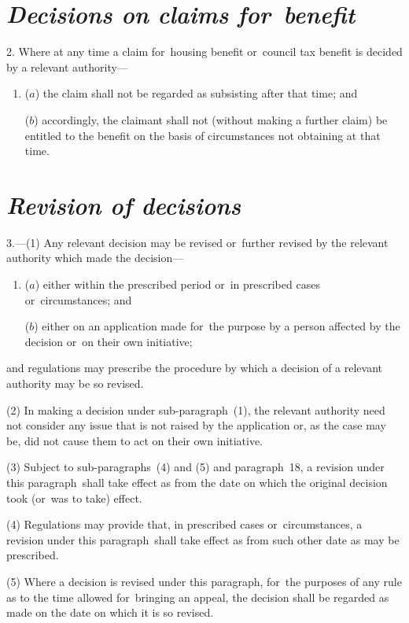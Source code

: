 \documentclass[12pt,a4paper]{article}
\begin{document}

\section*{\itshape Decisions on claims for~benefit}

2. Where at any time a claim for~housing benefit or~council tax benefit is decided by a relevant authority—
\begin{enumerate}\item[]
($a$) the claim shall not be regarded as subsisting after that time; and

($b$) accordingly, the claimant shall not (without making a further claim) be entitled to the benefit on the basis of circumstances not obtaining at that time.
\end{enumerate}

\section*{\itshape Revision of decisions}

3.---(1) Any relevant decision may be revised or~further revised by the relevant authority which made the decision—
\begin{enumerate}\item[]
($a$) either within the prescribed period or~in prescribed cases or~circumstances; and

($b$) either on an application made for~the purpose by a person affected by the decision or~on their own initiative;
\end{enumerate}
and regulations may prescribe the procedure by which a decision of a relevant authority may be so revised.

(2) In making a decision under sub-paragraph~(1), the relevant authority need not consider any issue that is not raised by the application or, as the case may be, did not cause them to act on their own initiative.

(3) Subject to sub-paragraphs~(4)  and (5)  and paragraph~18, a revision under this paragraph~shall take effect as from the date on which the original decision took (or~was to take) effect.

(4) Regulations may provide that, in prescribed cases or~circumstances, a revision under this paragraph~shall take effect as from such other date as may be prescribed.

(5) Where a decision is revised under this paragraph, for~the purposes of any rule as to the time allowed for~bringing an appeal, the decision shall be regarded as made on the date on which it is so revised.
\end{document}
